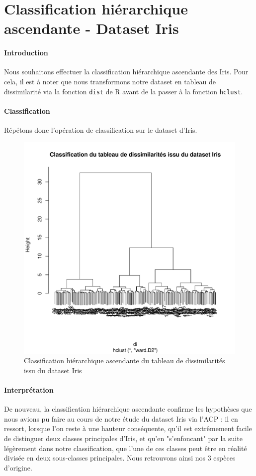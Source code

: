\documentclass{report}
\begin{document}
\section{Classification hiérarchique ascendante - Dataset Iris}
\paragraph{Introduction}
Nous souhaitons effectuer la classification hiérarchique ascendante des Iris. Pour cela, il est à noter que nous transformons notre dataset en tableau de dissimilarité via la fonction \verb+dist+ de R avant de la passer à la fonction \verb+hclust+.
\paragraph{Classification}
Répétons donc l'opération de classification sur le dataset d'Iris.
\begin{figure}[ht!]
\begin{center}
    \includegraphics[width=\textwidth]{../plots/E2Q2_cdi.pdf}
    \caption{Classification hiérarchique ascendante du tableau de dissimilarités issu du dataset Iris}
\end{center}
\end{figure}
\newpage
\paragraph{Interprétation}
De nouveau, la classification hiérarchique ascendante confirme les hypothèses que nous avions pu faire au cours de notre étude du dataset Iris via l'ACP : il en ressort, lorsque l'on reste à une hauteur conséquente, qu'il est extrêmement facile de distinguer deux classes principales d'Iris, et qu'en "s'enfoncant" par la suite légèrement dans notre classification, que l'une de ces classes peut être en réalité divisée en deux sous-classes principales. Nous retrouvons ainsi nos 3 espèces d'origine.
\newpage
\end{document}
